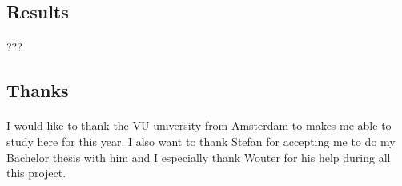 \documentclass{article}
\begin{document}
	\subsection{Results}
		\paragraph{}
			???
	\subsection{Thanks}
		\paragraph{}
			I would like to thank the VU university from Amsterdam to makes me able to study here for this year.
			I also want to thank Stefan for accepting me to do my Bachelor thesis with him
			and I especially thank Wouter for his help during all this project.

\newpage


\end{document}
